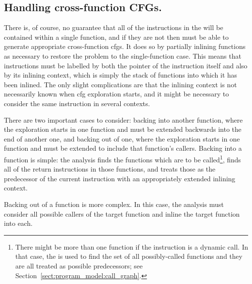 \subsection{Handling cross-function CFGs.}

\label{sect:derive:cross_function_cfgs}


There is, of course, no guarantee that all of the instructions in the
 will be contained within a single function,
and if they are not then {\technique} must be able to generate
appropriate cross-function \glspl{cfg}.  It does so by partially
inlining functions as necessary to restore the problem to the
single-function case.  This means that instructions must be labelled
by both the pointer of the instruction itself and also by its inlining
context, which is simply the stack of functions into which it has been
inlined.  The only slight complications
are that the inlining context is not necessarily known when \gls{cfg}
exploration starts, and it might be necessary to consider the same
instruction in several contexts.


There are two important cases to consider: backing into another
function, where the exploration starts in one function and must be
extended backwards into the end of another one, and backing out of
one, where the exploration starts in one function and must be extended
to include that function's callers.  Backing into a function is
simple: the analysis finds the functions which are to be
called\footnote{There might be more than one function if the
  instruction is a dynamic call.  In that case, the  is used to find the set of all possibly-called functions
  and they are all treated as possible predecessors; see
  Section~\ref{sect:program_model:call_graph}.}, finds all of the
return instructions in those functions, and treats those as the
predecessor of the current instruction with an appropriately extended
inlining context.

Backing out of a function is more complex.  In this case, the analysis
must consider all possible callers of the target function and inline
the target function into each.  


